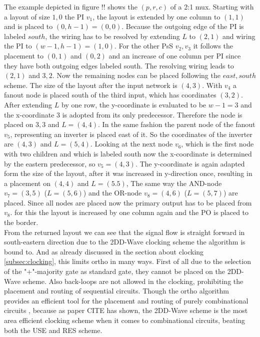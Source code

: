 The example depicted in figure !! shows the $(p, r, c)$ of a 2:1 mux. Starting with a layout of size $1, 0$ the PI $v_1$, the layout is extended by one column to $(1, 1)$ and is placed to $(0, h-1) = (0, 0)$. Because the outgoing edge of the PI is labeled $south$, the wiring has to be resolved by extending $L$ to $(2, 1)$ and wiring the PI to $(w-1, h-1)=(1, 0)$. For the other PsS $v_2, v_3$ it follows the placement to $(0, 1)$ and $(0, 2)$ and an increase of one column per PI since they have both outgoing edges labeled south. The resolving wiring leads to $(2, 1)$ and $3, 2$. Now the remaining nodes can be placed following the $east, south$ scheme. The size of the layout after the input network is $(4, 3)$. With $v_4$ a fanout node is placed south of the third input, which has coordinates $(3, 2)$. After extending $L$ by one row, the y-coordinate is evaluated to be $w-1 = 3$ and the x-coordinate $3$ is adopted from its only predecessor. Therefore the node is placed on $3, 3$ and $L=(4, 4)$. In the same fashion the parent node of the fanout $v_5$, representing an inverter is placed east of it. So the coordinates of the inverter are $(4, 3)$ and $L = (5, 4)$. Looking at the next node $v_6$, which is the first node with two children and which is labeled south now the x-coordinate is determined by the eastern predecessor, so $v_5 = (4, 3)$. The y-coordinate is again adapted form the size of the layout, after it was increased in y-direction once, resulting in a placement on $(4, 4)$ and $L = (5. 5)$, The same way the AND-node $v_7 = (3, 5)$ ($L = (5, 6)$) and the OR-node $v_8 = (4, 6)$ ($L = (5, 7)$) are placed. Since all nodes are placed now the primary output has to be placed from $v_8$. for this the layout is increased by one column again and the PO is placed to the border.\\
From the returned layout we can see that the signal flow is straight forward in south-eastern direction due to the 2DD-Wave clocking scheme the algorithm is bound to. And as already discussed in the section about clocking \ref{subsec:clocking}, this limits ortho in many ways. First of all due to the selection of the "+"-majority gate as standard gate, they cannot be placed on the 2DD-Wave scheme. Also back-loops are not allowed in the clocking, prohibiting the placement and routing of sequential circuits. Though the ortho algorithm provides an efficient tool for the placement and routing of purely combinational circuits , because as paper CITE has shown, the 2DD-Wave scheme is the most area efficient clocking scheme when it comes to combinational circuits, beating both the USE and RES scheme.\\

